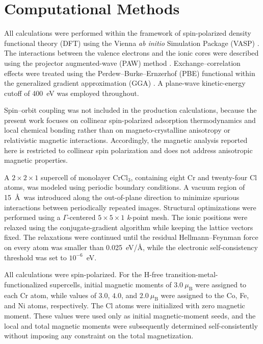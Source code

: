\documentclass[journal=jacsat,manuscript=article]{achemso}
\begin{document}
\section{Computational Methods}

\noindent All calculations were performed within the framework of spin-polarized density functional theory (DFT) using the Vienna \textit{ab initio} Simulation Package (VASP) \cite{Kresse1996CMS,Kresse1996PRB}. The interactions between
the valence electrons and the ionic cores were described using the projector augmented-wave (PAW) method \cite{Blochl1994,Kresse1999}. Exchange--correlation effects were treated using the Perdew--Burke--Ernzerhof (PBE) functional within the generalized gradient approximation (GGA) \cite{PhysRevLett.77.3865}. A plane-wave kinetic-energy cutoff of 400~eV was employed throughout.

Spin--orbit coupling was not included in the production calculations, because the present work focuses on collinear spin-polarized adsorption thermodynamics and local chemical bonding rather than on magneto-crystalline anisotropy or relativistic magnetic interactions. Accordingly, the magnetic analysis reported here is restricted to collinear spin polarization and does not address anisotropic magnetic
properties.

A $2 \times 2 \times 1$ supercell of monolayer CrCl$_3$, containing eight Cr and twenty-four Cl atoms, was modeled using periodic boundary conditions. A vacuum region of 15~\AA\ was introduced along the out-of-plane direction to minimize spurious interactions between periodically repeated images. Structural optimizations were performed using a $\Gamma$-centered $5 \times 5 \times 1$ \textit{k}-point mesh. The ionic positions were relaxed using the conjugate-gradient algorithm while keeping the lattice vectors fixed. The relaxations were continued until the residual Hellmann--Feynman force on every atom was smaller than 0.025~eV/\AA, while the electronic self-consistency threshold was set to $10^{-6}$~eV.

All calculations were spin-polarized. For the H-free transition-metal-functionalized supercells, initial magnetic moments of $3.0~\mu_{\mathrm{B}}$ were assigned to each Cr atom, while values of $3.0$, $4.0$, and $2.0~\mu_{\mathrm{B}}$ were assigned to the Co, Fe, and Ni atoms, respectively. The Cl atoms were initialized with zero magnetic moment. These values were used only as initial magnetic-moment seeds, and the local and total magnetic moments were subsequently determined self-consistently without imposing any constraint on the total magnetization.
\end{document}
